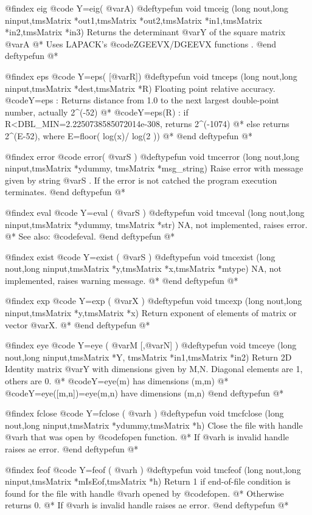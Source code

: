@findex   eig
@code{  Y=eig( @var{A})}
@deftypefun void tmceig (long nout,long ninput,tmsMatrix *out1,tmsMatrix *out2,tmsMatrix *in1,tmsMatrix *in2,tmsMatrix *in3)
Returns the determinant @var{Y}  of the square matrix @var{A} @*
Uses LAPACK's @code{ZGEEVX/DGEEVX}  functions . 
@end deftypefun
@*


@findex  eps
@code{  Y=eps( [@var{R}])}
@deftypefun void tmceps (long nout,long ninput,tmsMatrix *dest,tmsMatrix *R)
Floating point relative accuracy.
@code{Y=eps} : Returns distance from 1.0 to the next largest double-point number, actually  2^(-52) @*
@code{Y=eps(R)} : if R<DBL_MIN=2.2250738585072014e-308, returns  2^(-1074) @*
				     else  returns  2^(E-52), where E=floor(  log(x)/ log(2 ))  @*
@end deftypefun
@*

@findex  error
@code{  error(  @var{S} )}
@deftypefun void tmcerror (long nout,long ninput,tmsMatrix *ydummy, tmsMatrix *msg_string)
Raise error with message given by string @var{S} .
If the error is not catched the program execution terminates.
@end deftypefun
@*


@findex  eval 
@code{  Y=eval (  @var{S} )}
@deftypefun void tmceval (long nout,long ninput,tmsMatrix *ydummy, tmsMatrix *str)
NA, not implemented, raises error. @*
See also: @code{feval}.
@end deftypefun
@*

@findex  exist 
@code{  Y=exist (  @var{S} )}
@deftypefun void tmcexist (long nout,long ninput,tmsMatrix *y,tmsMatrix *x,tmsMatrix *mtype)
NA, not implemented, raises warning message. @*
@end deftypefun
@*

@findex  exp 
@code{  Y=exp (  @var{X} )}
@deftypefun void tmcexp (long nout,long ninput,tmsMatrix *y,tmsMatrix *x)
Return exponent of elements of matrix or vector @var{X}. @*
@end deftypefun
@*


@findex  eye 
@code{  Y=eye (  @var{M} [,@var{N}] )}
@deftypefun void tmceye (long nout,long ninput,tmsMatrix *Y, tmsMatrix *in1,tmsMatrix *in2)
Return 2D Identity matrix @var{Y} with dimensions given by M,N. Diagonal elements are 1, others are 0. @*
@code{Y=eye(m)} has  dimensions (m,m) @*
@code{Y=eye([m,n])=eye(m,n)} have dimensions (m,n)
@end deftypefun
@*

@findex  fclose 
@code{  Y=fclose (  @var{h}  )}
@deftypefun void tmcfclose (long nout,long ninput,tmsMatrix *ydummy,tmsMatrix *h)
Close the file with handle @var{h}  that was open by @code{fopen} function. @*
If @var{h} is invalid handle raises ae error.
@end deftypefun
@*

@findex  feof 
@code{  Y=feof (  @var{h}  )}
@deftypefun void tmcfeof (long nout,long ninput,tmsMatrix *mIsEof,tmsMatrix *h)
Return  1 if end-of-file condition is found for the file with handle @var{h} opened by @code{fopen}. @*
Otherwise returns 0. @*
If @var{h} is invalid handle raises ae error.
@end deftypefun
@*
 


